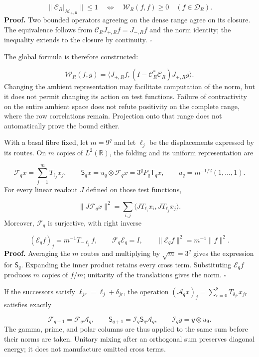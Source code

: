 \[
\|\mathcal C_R|_{\mathcal M_{+,R}}\|\leq1
\quad\Longleftrightarrow\quad
\mathscr W_R(f,f)\geq0\quad(f\in\mathcal D_R).
\]
\textbf{Proof.} Two bounded operators agreeing on the dense range agree on its closure. The equivalence follows from \(\mathcal C_RJ_{+,R}f=J_{-,R}f\) and the norm identity; the inequality extends to the closure by continuity. \hfill\(\square\)

The global formula is therefore constructed:

\[
\mathscr W_R(f,g)=
\langle J_{+,R}f,(I-\mathcal C_R^*\mathcal C_R)J_{+,R}g\rangle.
\]
Changing the ambient representation may facilitate computation of the norm, but it does not permit changing its action on test functions. Failure of contractivity on the entire ambient space does not refute positivity on the complete range, where the row correlations remain. Projection onto that range does not automatically prove the bound either.

With a basal fibre fixed, let \(m=9^q\) and let \(\ell_j\) be the displacements expressed by its routes. On \(m\) copies of \(L^2(\mathbb R)\), the folding and its uniform representation are

\[
\mathcal F_qx=\sum_{j=1}^mT_{\ell_j}x_j,\qquad
\mathsf S_qx=u_q\otimes\mathcal F_qx=3^qP_q\mathsf T_qx,
\qquad u_q=m^{-1/2}(1,\ldots,1).
\]
For every linear readout \(J\) defined on those test functions,

\[
\|J\mathcal F_qx\|^2
=\sum_{i,j}\langle JT_{\ell_i}x_i,JT_{\ell_j}x_j\rangle.
\]
Moreover, \(\mathcal F_q\) is surjective, with right inverse

\[
(\mathcal E_qf)_j=m^{-1}T_{-\ell_j}f,\qquad
\mathcal F_q\mathcal E_q=I,\qquad
\|\mathcal E_qf\|^2=m^{-1}\|f\|^2.
\]
\textbf{Proof.} Averaging the \(m\) routes and multiplying by \(\sqrt m=3^q\) gives the expression for \(\mathsf S_q\). Expanding the inner product retains every cross term. Substituting \(\mathcal E_qf\) produces \(m\) copies of \(f/m\); unitarity of the translations gives the norm. \hfill\(\square\)

If the successors satisfy \(\ell_{jr}=\ell_j+\delta_{jr}\), the operation \((\mathcal A_qx)_j=\sum_{r=0}^8T_{\delta_{jr}}x_{jr}\) satisfies exactly

\[
\mathcal F_{q+1}=\mathcal F_q\mathcal A_q,\qquad
\mathsf S_{q+1}=\mathcal I_q\mathsf S_q\mathcal A_q,\qquad
\mathcal I_qy=y\otimes u_9.
\]
The gamma, prime, and polar columns are thus applied to the same sum before their norms are taken. Unitary mixing after an orthogonal sum preserves diagonal energy; it does not manufacture omitted cross terms.

